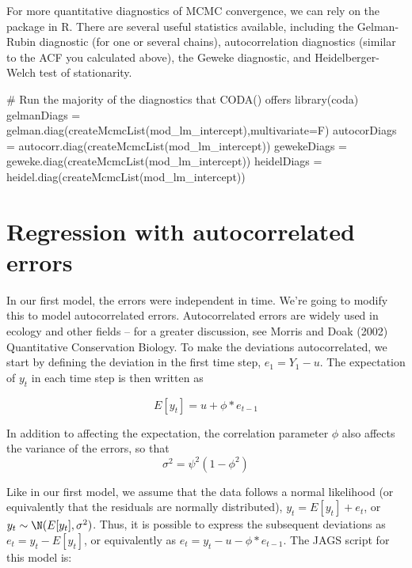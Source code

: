 For more quantitative diagnostics of MCMC convergence, we can rely on the \verb@coda@ package in R. There
are several useful statistics available, including the Gelman-Rubin diagnostic (for one or several chains), autocorrelation diagnostics (similar to the ACF you calculated above), the Geweke diagnostic, and Heidelberger-Welch test of stationarity. 

\begin{Schunk}
\begin{Sinput}
 # Run the majority of the diagnostics that CODA() offers
 library(coda)
 gelmanDiags = gelman.diag(createMcmcList(mod_lm_intercept),multivariate=F)
 autocorDiags = autocorr.diag(createMcmcList(mod_lm_intercept))
 gewekeDiags = geweke.diag(createMcmcList(mod_lm_intercept))
 heidelDiags = heidel.diag(createMcmcList(mod_lm_intercept))
\end{Sinput}
\end{Schunk}


\section{Regression with autocorrelated errors}\label{sec:regression-with-corr-errors}

In our first model, the errors were independent in time. We're going to modify this to model autocorrelated errors. Autocorrelated errors are widely used in ecology and other fields -- for a greater discussion, see Morris and Doak (2002) Quantitative Conservation Biology. To make the deviations autocorrelated, we start by defining the deviation in the first time step, $e_1 = Y_1 - u$. The expectation of $y_t$ in each time step is then written as 

\begin{equation}
E[y_t] = u + \phi * e_{t-1}
\end{equation}

In addition to affecting the expectation, the correlation parameter $\phi$ also affects the variance of the errors, so that 
\begin{equation}
\sigma^2 = \psi^2\left( 1-\phi^2 \right) 
\end{equation}

Like in our first model, we assume that the data follows a normal likelihood (or equivalently that the residuals are normally distributed), ${y_t} = E[{y_t}] + {e}_{t}$, or ${y_t} \sim \N(E[{y_t}], \sigma^2)$. Thus, it is possible to express the subsequent deviations as ${e}_{t} = {y}_{t} - E[{y_t}]$, or equivalently as ${e}_{t} = {y}_{t} - {u} -\phi * {e}_{t-1}$. The JAGS script for this model is:


